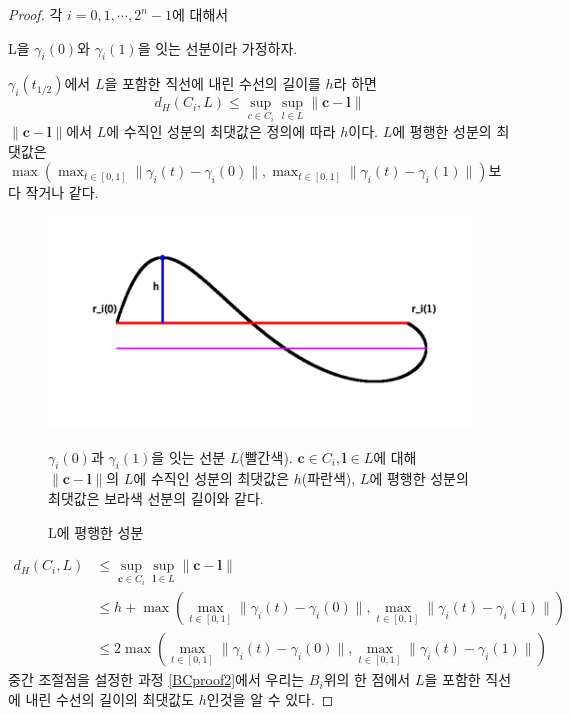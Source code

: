 \documentclass{gshs_thesis}
\theoremstyle{theorem}
\theoremstyle{lemma}
\theoremstyle{definition}
\begin{document}
\begin{proof}
	각 $i=0,1,\cdots,2^{n}-1$에 대해서
	
	L을 $\gamma_{i}(0)$와 $\gamma_{i}(1)$을 잇는 선분이라 가정하자.
	
	$\gamma_{i}(t_{1/2})$에서 $L$을 포함한 직선에 내린 수선의 길이를 $h$라 하면 
	\begin{equation*}
		d_{H}(C_{i},L)\leq{\sup_{c\in{C_{i}}}\sup_{l\in{L}}\parallel\textbf{c}-\textbf{l}\parallel}
	\end{equation*}
$\parallel\textbf{c}-\textbf{l}\parallel$에서 $L$에 수직인 성분의 최댓값은 정의에 따라 $h$이다. $L$에 평행한 성분의 최댓값은 $\max(\max_{t\in[0,1]}\parallel\gamma_{i}(t)-\gamma_{i}(0)\parallel,\max_{t\in[0,1]}\parallel\gamma_{i}(t)-\gamma_{i}(1)\parallel)$보다 작거나 같다.
\begin{figure}[h]
	\begin{center}
	\includegraphics[width=.7\textwidth]{image/BCproof1}
	\caption{L에 평행한 성분}
    \end{center} 
	\small\raggedright 
	$\gamma_{i}(0)$과 $\gamma_{i}(1)$을 잇는 선분 $L$(빨간색). $\textbf{c}\in{C_{i}},\textbf{l}\in{L}$에 대해 $\parallel\textbf{c}-\textbf{l}\parallel$의 $L$에 수직인 성분의 최댓값은 $h$(파란색), $L$에 평행한 성분의 최댓값은 보라색 선분의 길이와 같다.
\end{figure}
\begin{equation}
  \begin{split}
   d_{H}(C_{i},L)&\leq\sup_{\textbf{c}\in{C_{i}}}\sup_{\textbf{l}\in{L}}\parallel\textbf{c}-\textbf{l}\parallel \\
   &\leq{h+\max\left(\max_{t\in[0,1]}\parallel\gamma_{i}(t)-\gamma_{i}(0)\parallel,\max_{t\in[0,1]}\parallel\gamma_{i}(t)-\gamma_{i}(1)\parallel\right)} \\
   &\leq{2\max\left(\max_{t\in[0,1]}\parallel\gamma_{i}(t)-\gamma_{i}(0)\parallel,\max_{t\in[0,1]}\parallel\gamma_{i}(t)-\gamma_{i}(1)\parallel\right)}
  \end{split}
\end{equation}
중간 조절점을 설정한 과정 \cref{BCproof2}에서 우리는 $B_{i}$위의 한 점에서 $L$을 포함한 직선에 내린 수선의 길이의 최댓값도 $h$인것을 알 수 있다.

\end{proof}
\end{document}
